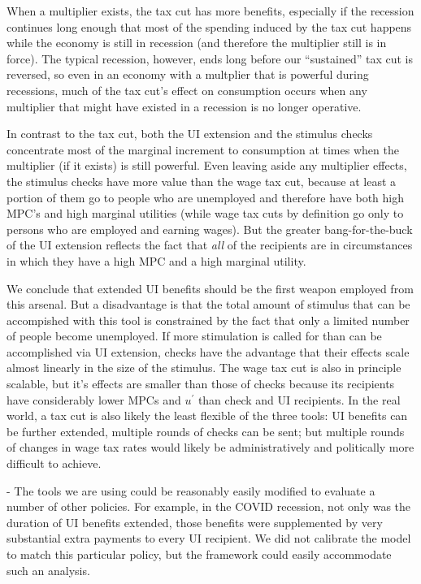 \documentclass[../HAFiscal]{subfiles}
\begin{document}
When a multiplier exists, the tax cut has more benefits, especially if the recession continues long enough that most of the spending induced by the tax cut happens while the economy is still in recession (and therefore the multiplier still is in force).  The typical recession, however, ends long before our ``sustained'' tax cut is reversed, so even in an economy with a multplier that is powerful during recessions, much of the tax cut's effect on consumption occurs when any multiplier that might have existed in a recession is no longer operative.

In contrast to the tax cut, both the UI extension and the stimulus checks concentrate most of the marginal increment to consumption at times when the multiplier (if it exists) is still powerful.  Even leaving aside any multiplier effects, the stimulus checks have more value than the wage tax cut, because at least a portion of them go to people who are unemployed and therefore have both high MPC's and high marginal utilities (while wage tax cuts by definition go only to persons who are employed and earning wages).  But the greater bang-for-the-buck of the UI extension reflects the fact that \textit{all} of the recipients are in circumstances in which they have a high MPC and a high marginal utility.

We conclude that extended UI benefits should be the first weapon employed from this arsenal.  But a disadvantage is that the total amount of stimulus that can be accompished with this tool is constrained by the fact that only a limited number of people become unemployed.  If more stimulation is called for than can be accomplished via UI extension, checks have the advantage that their effects scale almost linearly in the size of the stimulus.  The wage tax cut is also in principle scalable, but it's effects are smaller than those of checks because its recipients have considerably lower MPCs and $u^{\prime}$ than check and UI recipients.  In the real world, a tax cut is also likely the least flexible of the three tools:  UI benefits can be further extended, multiple rounds of checks can be sent; but multiple rounds of changes in wage tax rates would likely be administratively and politically more difficult to achieve.

- The tools we are using could be reasonably easily modified to evaluate a number of other policies.  For example, in the COVID recession, not only was the duration of UI benefits extended, those benefits were supplemented by very substantial extra payments to every UI recipient.  We did not calibrate the model to match this particular policy, but the framework could easily accommodate such an analysis.
\end{document}
